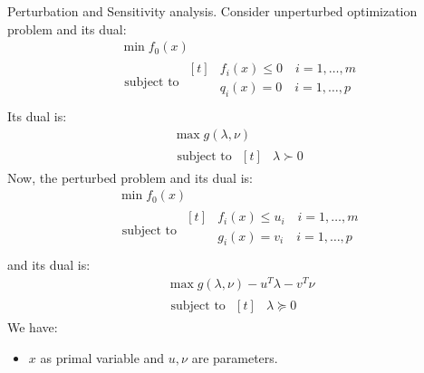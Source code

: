 \begin{remark}
    Perturbation and Sensitivity analysis. Consider unperturbed optimization problem and its dual:
    \begin{equation*}
    \begin{aligned}
        &\min f_0(x) \\
        &\text{ subject to } \begin{aligned}[t]
            &f_i(x)\le0 \quad i=1,\dots,m \\
            &q_i(x)=0 \quad i=1,\dots,p \\
        \end{aligned}
    \end{aligned}
    \end{equation*}
    Its dual is:
    \begin{equation*}
    \begin{aligned}
        &\max g(\lambda,\nu) \\
        &\text{ subject to } \begin{aligned}[t]
            &\lambda \succ0
        \end{aligned}
    \end{aligned}
    \end{equation*}
    Now, the perturbed problem and its dual is:
    \begin{equation*}
    \begin{aligned}
        &\min f_0(x) \\
        &\text{ subject to } \begin{aligned}[t]
            &f_i(x)\le u_i \quad i=1,\dots,m \\
            &g_i(x)= v_i \quad i=1,\dots,p \\
        \end{aligned}
    \end{aligned}
    \end{equation*}
    and its dual is:
    \begin{equation*}
    \begin{aligned}
        &\max g(\lambda, \nu) - u^T\lambda - v^T\nu \\
        &\text{ subject to } \begin{aligned}[t]
            &\lambda\succeq0
        \end{aligned}
    \end{aligned}
    \end{equation*}
    We have:
    \begin{itemize}
        \item $x$ as primal variable and $u, \nu$ are parameters. 

\end{itemize}
\end{remark}
